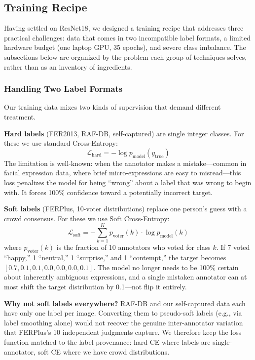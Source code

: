 \documentclass[12pt,a4paper]{article}
\begin{document}
\subsection{Training Recipe}

Having settled on ResNet18, we designed a training recipe that addresses three practical challenges: data that comes in two incompatible label formats, a limited hardware budget (one laptop GPU, 35 epochs), and severe class imbalance. The subsections below are organized by the problem each group of techniques solves, rather than as an inventory of ingredients.

\subsubsection{Handling Two Label Formats}

Our training data mixes two kinds of supervision that demand different treatment.

\textbf{Hard labels} (FER2013, RAF-DB, self-captured) are single integer classes. For these we use standard Cross-Entropy:
\begin{equation}
\mathcal{L}_{\text{hard}} = -\log p_{\text{model}}(y_{\text{true}})
\end{equation}
The limitation is well-known: when the annotator makes a mistake---common in facial expression data, where brief micro-expressions are easy to misread---this loss penalizes the model for being ``wrong'' about a label that was wrong to begin with. It forces 100\% confidence toward a potentially incorrect target.

\textbf{Soft labels} (FERPlus, 10-voter distributions) replace one person's guess with a crowd consensus. For these we use Soft Cross-Entropy:
\begin{equation}
\mathcal{L}_{\text{soft}} = -\sum_{k=1}^{K} p_{\text{voter}}(k) \cdot \log p_{\text{model}}(k)
\end{equation}
where $p_{\text{voter}}(k)$ is the fraction of 10 annotators who voted for class $k$. If 7 voted ``happy,'' 1 ``neutral,'' 1 ``surprise,'' and 1 ``contempt,'' the target becomes $[0.7, 0.1, 0.1, 0.0, 0.0, 0.0, 0.1]$. The model no longer needs to be 100\% certain about inherently ambiguous expressions, and a single mistaken annotator can at most shift the target distribution by 0.1---not flip it entirely.

\textbf{Why not soft labels everywhere?} RAF-DB and our self-captured data each have only one label per image. Converting them to pseudo-soft labels (e.g., via label smoothing alone) would not recover the genuine inter-annotator variation that FERPlus's 10 independent judgments capture. We therefore keep the loss function matched to the label provenance: hard CE where labels are single-annotator, soft CE where we have crowd distributions.
\end{document}

